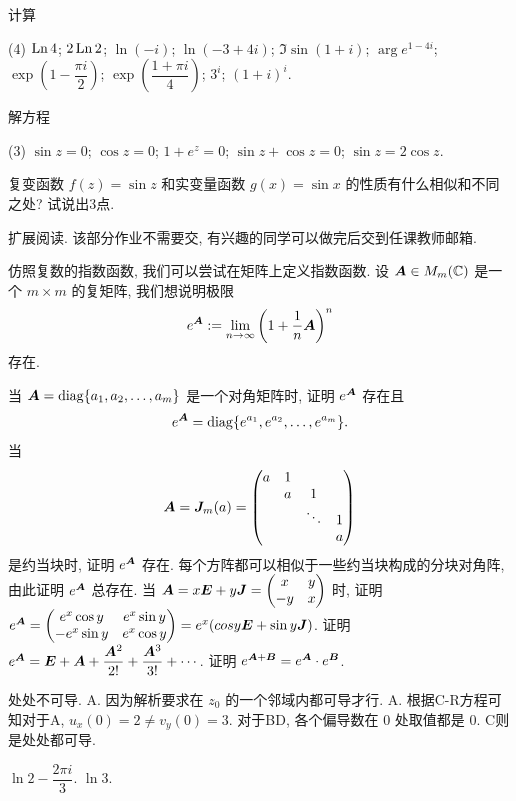 \begin{homework}
\begin{exlist}
			\item 计算
				\begin{tasks}(4)
					\task $\operatorname{Ln} 4$;
					\task $2\operatorname{Ln}2$;
					\task $\ln(-i)$;
					\task $\ln(-3+4i)$;
					\task $\Im\sin(1+i)$;
					\task $\arg e^{1-4i}$;
					\task $\exp\left(1-\dfrac{\pi i}2\right)$;
					\task $\exp\left(\dfrac{1+\pi i}4\right)$;
					\task $3^i$;
					\task $(1+i)^i$.
				\end{tasks}
			\item 解方程 
				\begin{tasks}(3)
					\task $\sin z=0$;
					\task $\cos z=0$;
					\task $1+e^z=0$;
					\task $\sin z+\cos z=0$;
					\task $\sin z=2\cos z$.
				\end{tasks}
			\item 复变函数 $f(z)=\sin z$ 和实变量函数 $g(x)=\sin x$ 的性质有什么相似和不同之处? 试说出3点.
		\end{exlist}
	\item 扩展阅读. 该部分作业不需要交, 有兴趣的同学可以做完后交到任课教师邮箱.
	
	仿照复数的指数函数, 我们可以尝试在矩阵上定义指数函数. 设 ${\boldsymbol{A}}\in M_m({\mathbb{C}})$ 是一个 $m\times m$ 的复矩阵, 我们想说明极限
	\[e^{\boldsymbol{A}}:=\lim_{n\to \infty}\left(1+\frac1n {\boldsymbol{A}}\right)^n\]
	存在.
	\begin{tasks}
		\task 当 ${\boldsymbol{A}}={\mathrm{diag}}{\left\{a_1,a_2,\dots,a_m\right\}}$ 是一个对角矩阵时, 证明 $e^{\boldsymbol{A}}$ 存在且
		\[e^{\boldsymbol{A}}={\mathrm{diag}}{\left\{e^{a_1},e^{a_2},\dots,e^{a_m}\right\}}.\]
		\task 当
		\[{\boldsymbol{A}}={\boldsymbol{J}}_m(a)=\begin{pmatrix}
			a&1&   &\\
			&a& 1 &\\
			& &\ddots&1\\
			& &      &a
		\end{pmatrix}\]
		是约当块时, 证明 $e^{\boldsymbol{A}}$ 存在.
		\task 每个方阵都可以相似于一些约当块构成的分块对角阵, 由此证明 $e^{\boldsymbol{A}}$ 总存在.
		\task 当 ${\boldsymbol{A}}=x{\boldsymbol{E}}+y{\boldsymbol{J}}=\begin{pmatrix}
			x&y\\-y&x
		\end{pmatrix}$ 时, 证明 $e^{\boldsymbol{A}}=\begin{pmatrix}
			e^x\cos y&e^x\sin y\\-e^x\sin y&e^x\cos y
		\end{pmatrix}=e^x(cos y{\boldsymbol{E}}+\sin y {\boldsymbol{J}})$.
		\task 证明 $e^{\boldsymbol{A}}={\boldsymbol{E}}+{\boldsymbol{A}}+\dfrac{{\boldsymbol{A}}^2}{2!}+\dfrac{{\boldsymbol{A}}^3}{3!}+\cdots$.
		\task 证明 $e^{{\boldsymbol{A}}+{\boldsymbol{B}}}=e^{\boldsymbol{A}}\cdot e^{\boldsymbol{B}}$.
	\end{tasks}
\end{homework}


\exerciseanswer
{} 处处不可导.
 A. 因为解析要求在 $z_0$ 的一个邻域内都可导才行.
 A. 根据C-R方程可知对于A, $u_x(0)=2\neq v_y(0)=3$. 对于BD, 各个偏导数在 $0$ 处取值都是 $0$. C则是处处都可导.

 $\ln 2-\dfrac{2\pi i}3$.
 $\ln 3$.



